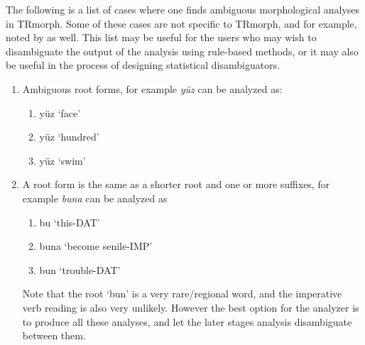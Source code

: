 \documentclass[twocolumn]{article}
\begin{document}
The following is a list of cases where one finds ambiguous
morphological analyses in TRmorph. Some of these cases are not
specific to TRmorph, and for example, noted by \cite{oflazer1997} as
well. This list may be useful for the users who may wish to
disambiguate the output of the analysis using rule-based methods, or
it may also be useful in the process of designing statistical
disambiguators.

\begin{enumerate}
\item Ambiguous root forms, for example \emph{yüz} can be analyzed as:
    \begin{enumerate}
    \item yüz `face'
    \item yüz `hundred'
    \item yüz `swim'
    \end{enumerate}
\item\label{itm:buna} A root form is the same as a shorter root and one or more
suffixes, for example \emph{buna} can be analyzed as
    \begin{enumerate}
    \item bu `this-DAT'
    \item buna `become senile-IMP'
    \item bun   `trouble-DAT'
    \end{enumerate}
Note that the root `bun' is a very rare/regional word, and the imperative
verb reading is also very unlikely. However the best option
for the analyzer is to produce all these analyses, and let the later
stages analysis disambiguate between them.


\end{enumerate}
\end{document}
